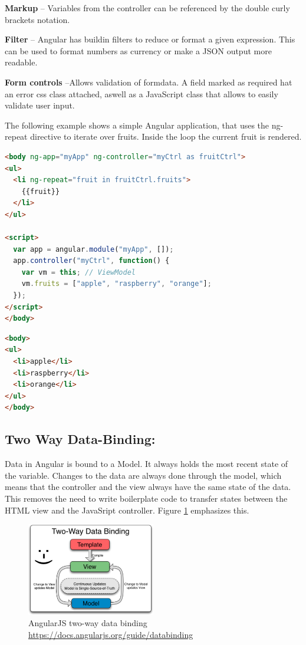 \noindent\textbf{Markup} -- Variables from the controller can be referenced by the double curly brackets notation.

\noindent\textbf{Filter} -- Angular has buildin filters to reduce or format a given expression. This can be used to format numbers as currency or make a JSON output more readable.

\noindent\textbf{Form controls} --Allows validation of formdata. A field marked as required hat an error css class attached, aswell as a JavaScript class that allows to easily validate user input.\vspace{1ex}

The following example shows a simple Angular application, that uses the ng-repeat directive to iterate over fruits. Inside the loop the current fruit is rendered.

\begin{lstlisting}[language=html, caption=ng-repeat Angular fruit example, label=lst:angular]
<body ng-app="myApp" ng-controller="myCtrl as fruitCtrl">
<ul>
  <li ng-repeat="fruit in fruitCtrl.fruits">
    {{fruit}}
  </li>
</ul>

<script>
  var app = angular.module("myApp", []);
  app.controller("myCtrl", function() {
    var vm = this; // ViewModel
    vm.fruits = ["apple", "raspberry", "orange"];
  });
</script>
</body>
\end{lstlisting}

\begin{lstlisting}[language=html, caption=ng-repeat Fruit result]
<body>
<ul>
  <li>apple</li>
  <li>raspberry</li>
  <li>orange</li>
</ul>
</body>
\end{lstlisting}


\subsection{Two Way Data-Binding:}
\label{sec:tw-binding}
Data in Angular is bound to a Model. It always holds the most recent state of the variable. Changes to the data are always done through the model, which means that the controller and the view always have the same state of the data. This removes the need to write boilerplate code to transfer states between the HTML view and the JavaSript controller. Figure \ref{fig:tw-databinding} emphasizes this.

\begin{figure}[H]
	\centering\includegraphics[width=0.5\textwidth]{res/Two_Way_Data_Binding}
	\caption{AngularJS two-way data binding \url{https://docs.angularjs.org/guide/databinding}}
	\label{fig:tw-databinding}
\end{figure}


